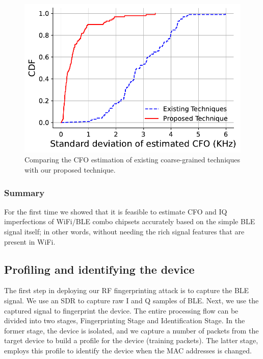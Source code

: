\begin{figure}[t!]
    \centering
    \includegraphics[width = \linewidth]{plots/CFO_comparison_ESP2.pdf} 
    \caption{Comparing the CFO estimation of existing coarse-grained techniques with our proposed technique.}
    \label{fig:cfo_comp}
\end{figure}


\subsubsection*{\textbf{Summary}}
For the first time we showed that it is feasible to estimate CFO and IQ imperfections of WiFi/BLE combo chipsets accurately based on the simple BLE signal itself; in other words, without needing the rich signal features that are present in WiFi.


\subsection{Profiling and identifying the device}
\label{sec:methodology2}

The first step in deploying our RF fingerprinting attack is to capture the BLE signal. We use an SDR to capture raw I and Q samples of BLE. Next, we use the captured signal to fingerprint the device. The entire processing flow can be divided into two stages, Fingerprinting Stage and Identification Stage. In the former stage, the device is isolated, and we capture a number of packets from the target device to build a profile for the device (training packets). The latter stage, employs this profile to identify the device when the MAC addresses is changed.

